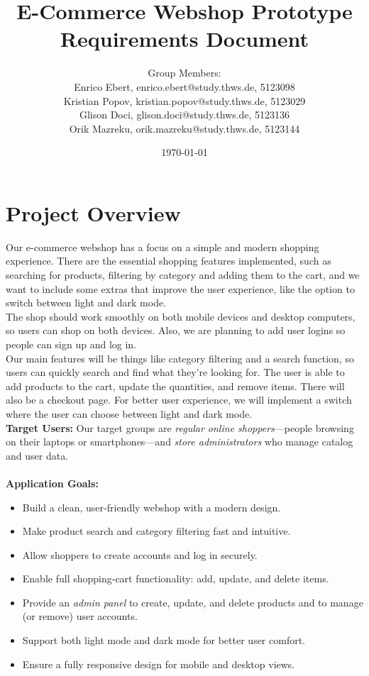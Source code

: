 \documentclass[a4paper,12pt]{article}
\title{E-Commerce Webshop Prototype \\
	Requirements Document}
\author{
	Group Members: \\
	Enrico Ebert, enrico.ebert@study.thws.de, 5123098 \\
	Kristian Popov, kristian.popov@study.thws.de, 5123029 \\
	Glison Doci, glison.doci@study.thws.de, 5123136 \\
	Orik Mazreku, orik.mazreku@study.thws.de, 5123144
}
\date{\today}
\begin{document}
	\maketitle


\section{Project Overview}




Our e-commerce webshop has a focus on a simple and modern shopping experience. There are the essential shopping features implemented, such as searching for products, filtering by category and adding them to the cart, and we want to include some extras that improve the user experience, like the option to switch between light and dark mode. \\




The shop should work smoothly on both mobile devices and desktop computers, so users can shop on both devices. Also, we are planning to add user logins so people can sign up and log in.\\




Our main features will be things like category filtering and a search function, so users can quickly search and find what they're looking for. The user is able to add products to the cart, update the quantities, and remove items. There will also be a checkout page. For better user experience, we will implement a switch where the user can choose between light and dark mode.\\




\textbf{Target Users:}
Our target groups are \emph{regular online shoppers}—people browsing on their laptops or smartphones—and \emph{store administrators} who manage catalog and user data.\\\\




\textbf{Application Goals:}
\begin{itemize}
	\item Build a clean, user‑friendly webshop with a modern design.
	\item Make product search and category filtering fast and intuitive.
	\item Allow shoppers to create accounts and log in securely.
	\item Enable full shopping‑cart functionality: add, update, and delete items.
	\item Provide an \emph{admin panel} to create, update, and delete products and to manage (or remove) user accounts.
	\item Support both light mode and dark mode for better user comfort.
	\item Ensure a fully responsive design for mobile and desktop views.




\end{itemize}
\end{document}
